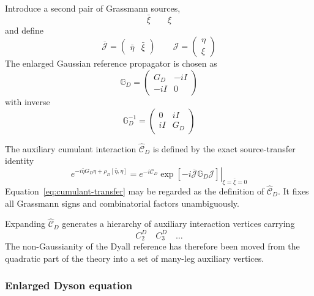 \documentclass[aip,jcp,reprint,noshowkeys,superscriptaddress]{revtex4-1}
\begin{document}
Introduce a second pair of Grassmann sources,
\begin{equation}
  \bar\xi
  \qquad
  \xi
\end{equation}
and define
\begin{equation}
  \overline{\mathcal J}
  =
  \begin{pmatrix}
    \bar\eta & \bar\xi
  \end{pmatrix}
  \qquad
  \mathcal J
  =
  \begin{pmatrix}
    \eta \\
    \xi
  \end{pmatrix}
\end{equation}
The enlarged Gaussian reference propagator is chosen as
\begin{equation}
  \mathbb G_D
  =
  \begin{pmatrix}
    G_D & -i I \\
    -i I & 0
  \end{pmatrix}
  \label{eq:super-dyall-gf}
\end{equation}
with inverse
\begin{equation}
  \mathbb G_D^{-1}
  =
  \begin{pmatrix}
    0 & i I \\
    i I & G_D
  \end{pmatrix}
  \label{eq:super-dyall-gf-inverse}
\end{equation}

The auxiliary cumulant interaction $\widehat{\mathcal C}_D$ is defined
by the exact source-transfer identity
\begin{equation}
  e^{-i\bar\eta G_D\eta + \rho_D[\bar\eta,\eta]}
  =
  \left.
  e^{-i\widehat{\mathcal C}_D}
  \exp
  \left[
    -i
    \overline{\mathcal J}
    \mathbb G_D
    \mathcal J
  \right]
  \right|_{\xi=\bar\xi=0}
  \label{eq:cumulant-transfer}
\end{equation}
Equation~\eqref{eq:cumulant-transfer} may be regarded as the definition
of $\widehat{\mathcal C}_D$.  It fixes all Grassmann signs and
combinatorial factors unambiguously.

Expanding $\widehat{\mathcal C}_D$ generates a hierarchy of auxiliary
interaction vertices carrying
\begin{equation}
  C_2^D
  \quad
  C_3^D
  \quad
  \ldots
\end{equation}
The non-Gaussianity of the Dyall reference has therefore been moved from
the quadratic part of the theory into a set of many-leg auxiliary
vertices.


\subsubsection{Enlarged Dyson equation}
\end{document}
